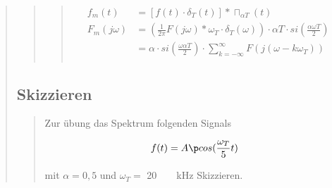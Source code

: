 \begin{quote}
\begin{quote}
\begin{quote}
            
            \begin{equation*}
                \begin{split}
                    f_m (t) &= [f (t) \cdot \delta_T (t)] \ast \sqcap_{\alpha T} (t)\\
                    F_m (j\omega) &= \left ( \frac{1}{2 \pi} F (j\omega) \ast \omega_T \cdot \delta_T (\omega) \right) \cdot
                    \alpha T \cdot si (\frac{\alpha \omega T}{2})\\
                    &= \alpha \cdot si \left( \frac{\omega \alpha T}{2} \right) \cdot \sum_{k=-\infty}^{\infty} F(j(\omega -
                    k\omega_T))\\
                    \label{eq:flat}
                \end{split}
            \end{equation*}
            
            
        \end{quote}
        
        
    \end{quote}
    
    
    \subsection{Skizzieren}
    \begin{quote}
        Zur übung das Spektrum folgenden Signals
        
        \begin{equation*}
        	\begin{split}
                f(t) = A \p cos(\frac{\omega_T}{5} t)
        	\end{split}
        \end{equation*}
        
        mit $\alpha = 0,5$ und $\omega_T =$ \SI{20}{\pi\ \kilo\hertz} Skizzieren.
        

\end{quote}
\end{quote}
